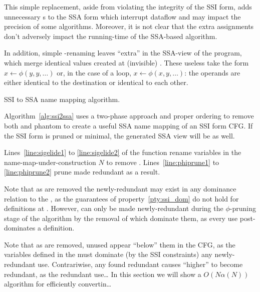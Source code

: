 \documentclass[12pt,titlepage,twoside]{article}
\begin{document}
{This simple replacement, aside from violating the integrity of the
SSI form, adds unnecessary s to the SSA form which
interrupt dataflow and may impact the precision of some algorithms.
Moreover, it is not clear that the extra assignments don't adversely
impact the running-time of the SSA-based algorithm.

In addition, simple \sigfunction{}-renaming leaves ``extra''
 in the SSA-view of the program, which merge identical
values created at (invisible) .  These useless
 take the form $x\gets\phi(y,y,\ldots)$ or, in the
case of a loop, $x\gets\phi(x,y,\ldots)$: the operands are either
identical to the destination or identical to each other.

\begin{myalgorithm}\small

\caption{SSI to SSA name mapping algorithm.}
\label{alg:ssi2ssa}
\end{myalgorithm}
Algorithm~\ref{alg:ssi2ssa} uses a two-phase approach and proper
ordering to remove both  and phantom  to
create a useful SSA name mapping of an SSI form CFG.  If the SSI form
is pruned or minimal, the generated SSA view will be as well.

Lines~\ref{line:sigelide1} to \ref{line:sigelide2} of the
 function rename variables in the
name-map-under-construction $N$ to remove .
Lines~\ref{line:phiprune1} to \ref{line:phiprune2} prune
 made redundant as a result.

Note that as  are removed the newly-redundant
 may exist in any dominance relation to the
\sigfunction{}, as the guarantees of property~\ref{pty:ssi_dom} do not
hold for definitions at .  However,  can
only be made newly-redundant during the $\phi$-pruning stage of the
algorithm by the removal of  which dominate them, as
every use post-dominates a \phifunction{} definition.

Note that as  are removed, unused 
appear ``below'' them in the CFG, as the variables defined in the
\sigfunction{} must dominate (by the SSI constraints) any
newly-redundant use.  Contrariwise, any  found
redundant causes ``higher''  to become redundant, as
the redundant use\ldots
%
In this section we will show a $O(N\alpha(N))$ algorithm for
efficiently convertin\ldots %
} %
\end{document}
